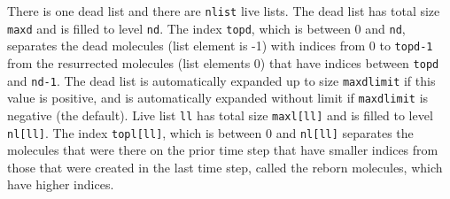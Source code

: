 \documentclass {book}
\begin{document}
There is one dead list and there are \texttt{nlist} live lists.  The dead list has total size \texttt{maxd} and is filled to level \texttt{nd}.  The index \texttt{topd}, which is between 0 and \texttt{nd}, separates the dead molecules (list element is -1) with indices from 0 to \texttt{topd-1} from the resurrected molecules (list elements 0) that have indices between \texttt{topd} and \texttt{nd-1}.  The dead list is automatically expanded up to size \texttt{maxdlimit} if this value is positive, and is automatically expanded without limit if \texttt{maxdlimit} is negative (the default).  Live list \texttt{ll} has total size \texttt{maxl[ll]} and is filled to level \texttt{nl[ll]}.  The index \texttt{topl[ll]}, which is between 0 and \texttt{nl[ll]} separates the molecules that were there on the prior time step that have smaller indices from those that were created in the last time step, called the reborn molecules, which have higher indices.
\end{document}
